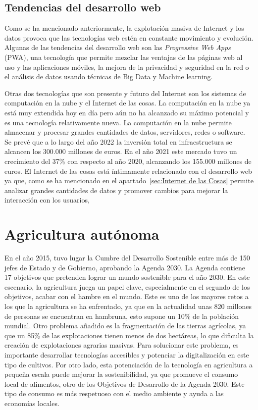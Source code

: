 \documentclass[a4paper, 12pt, oneside]{book}
\begin{document}
\subsection{Tendencias del desarrollo web}
\label{subsec: tendencias del desarrollo web}
Como se ha mencionado anteriormente, la explotación masiva de Internet y los datos provoca que las tecnologías web estén en constante movimiento y evolución. Algunas de las tendencias del desarrollo web son las \textit{Progressive Web Apps} (PWA), una tecnología que permite mezclar las ventajas de las páginas web al uso y las aplicaciones móviles, la mejora de la privacidad y seguridad en la red o el análisis de datos usando técnicas de Big Data y Machine learning. 

Otras dos tecnologías que son presente y futuro del Internet son los sistemas de computación en la nube y el Internet de las cosas. La computación en la nube ya está muy extendida hoy en día pero aún no ha alcanzado su máximo potencial y es una tecnología relativamente nueva. La computación en la nube permite almacenar y procesar grandes cantidades de datos, servidores, redes o software. Se prevé que a lo largo del año 2022 la inversión total en infraestructura se alcancen los 300.000 millones de euros. En el año 2021 este mercado tuvo un crecimiento del 37\% con respecto al año 2020, alcanzando los 155.000 millones de euros.
El Internet de las cosas está íntimamente relacionado con el desarrollo web ya que, como se ha mencionado en el apartado~\ref{sec:Internet de las Cosas} permite analizar grandes cantidades de datos y promover cambios para mejorar la interacción con los usuarios, 


\section{Agricultura autónoma}
\label{sec:agricultura autonoma}
En el año 2015, tuvo lugar la Cumbre del Desarrollo Sostenible entre más de 150 jefes de Estado y de Gobierno, aprobando  la Agenda 2030. La Agenda contiene 17 objetivos que pretenden lograr un mundo sostenible para el año 2030. En este escenario, la agricultura juega un papel clave, especialmente en el segundo de los objetivos, acabar con el hambre en el mundo. Este es uno de los mayores retos a los que la agricultura se ha enfrentado, ya que en la actualidad unas 820 millones de personas se encuentran en hambruna, esto supone un 10\% de la población mundial. Otro problema añadido es la fragmentación de las tierras agrícolas, ya que un 85\% de las explotaciones tienen menos de dos hectáreas, lo que dificulta la creación de explotaciones agrarias masivas. Para solucionar este problema, es importante desarrollar tecnologías accesibles y potenciar la digitalización en este tipo de cultivos. Por otro lado, esta potenciación de la tecnología en agricultura a pequeña escala puede mejorar la sostenibilidad, ya que promueve el consumo local de alimentos, otro de los Objetivos de Desarrollo de la Agenda 2030. Este tipo de consumo es más respetuoso con el medio ambiente y ayuda a las economías locales.
\end{document}
